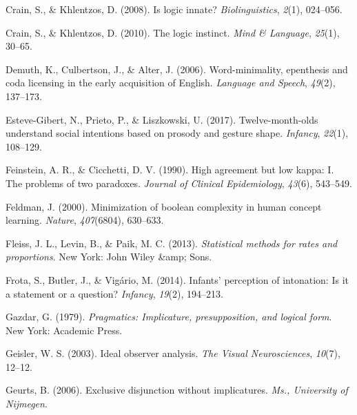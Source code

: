 \documentclass[
  ,man,floatsintext]{apa6}
\newlength{\cslhangindent}
\newlength{\cslentryspacingunit} %
\newenvironment{CSLReferences}[2] %
 {%
  \setlength{\parindent}{0pt}
  \ifodd #1
  \let\oldpar\par
  \def\par{\hangindent=\cslhangindent\oldpar}
  \fi
  \setlength{\parskip}{#2\cslentryspacingunit}
 }%
 {}
\begin{document}
\begin{CSLReferences}{1}{0}
\leavevmode{}%
Crain, S., \& Khlentzos, D. (2008). Is logic innate? \emph{Biolinguistics}, \emph{2}(1), 024--056.

\leavevmode{}%
Crain, S., \& Khlentzos, D. (2010). The logic instinct. \emph{Mind \& Language}, \emph{25}(1), 30--65.

\leavevmode{}%
Demuth, K., Culbertson, J., \& Alter, J. (2006). Word-minimality, epenthesis and coda licensing in the early acquisition of {E}nglish. \emph{Language and Speech}, \emph{49}(2), 137--173.

\leavevmode{}%
Esteve-Gibert, N., Prieto, P., \& Liszkowski, U. (2017). Twelve-month-olds understand social intentions based on prosody and gesture shape. \emph{Infancy}, \emph{22}(1), 108--129.

\leavevmode{}%
Feinstein, A. R., \& Cicchetti, D. V. (1990). High agreement but low kappa: I. The problems of two paradoxes. \emph{Journal of Clinical Epidemiology}, \emph{43}(6), 543--549.

\leavevmode{}%
Feldman, J. (2000). Minimization of boolean complexity in human concept learning. \emph{Nature}, \emph{407}(6804), 630--633.

\leavevmode{}%
Fleiss, J. L., Levin, B., \& Paik, M. C. (2013). \emph{Statistical methods for rates and proportions}. New York: John Wiley \&amp; Sons.

\leavevmode{}%
Frota, S., Butler, J., \& Vigário, M. (2014). Infants' perception of intonation: Is it a statement or a question? \emph{Infancy}, \emph{19}(2), 194--213.

\leavevmode{}%
Gazdar, G. (1979). \emph{Pragmatics: Implicature, presupposition, and logical form}. New York: Academic Press.

\leavevmode{}%
Geisler, W. S. (2003). Ideal observer analysis. \emph{The Visual Neurosciences}, \emph{10}(7), 12--12.

\leavevmode{}%
Geurts, B. (2006). Exclusive disjunction without implicatures. \emph{Ms., University of Nijmegen}.


\end{CSLReferences}
\end{document}
